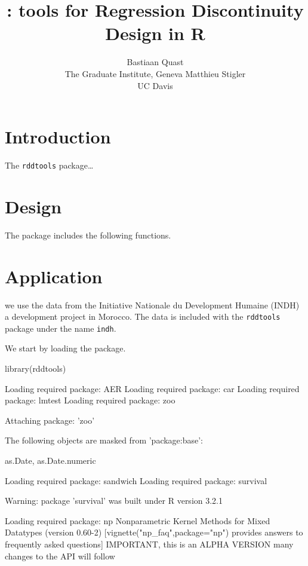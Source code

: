 \documentclass[article]{jss}
\author{
Bastiaan Quast\\The Graduate Institute, Geneva \And Matthieu Stigler\\UC Davis
}
\title{\pkg{rddtools}: tools for Regression Discontinuity Design in R}
\begin{document}
\section{Introduction}\label{introduction}

The \texttt{rddtools} package\ldots{}

\section{Design}\label{design}

The package includes the following functions.

\section{Application}\label{application}

we use the data from the Initiative Nationale du Development Humaine
(INDH) a development project in Morocco. The data is included with the
\texttt{rddtools} package under the name \texttt{indh}.

We start by loading the package.

\begin{CodeChunk}
\begin{CodeInput}
library(rddtools)
\end{CodeInput}
\begin{CodeOutput}
Loading required package: AER
Loading required package: car
Loading required package: lmtest
Loading required package: zoo

Attaching package: 'zoo'

The following objects are masked from 'package:base':

    as.Date, as.Date.numeric

Loading required package: sandwich
Loading required package: survival
\end{CodeOutput}
\begin{CodeOutput}
Warning: package 'survival' was built under R version 3.2.1
\end{CodeOutput}
\begin{CodeOutput}
Loading required package: np
Nonparametric Kernel Methods for Mixed Datatypes (version 0.60-2)
[vignette("np_faq",package="np") provides answers to frequently asked questions]
IMPORTANT, this is an ALPHA VERSION
                        many changes to the API will follow
\end{CodeOutput}
\end{CodeChunk}
\end{document}

